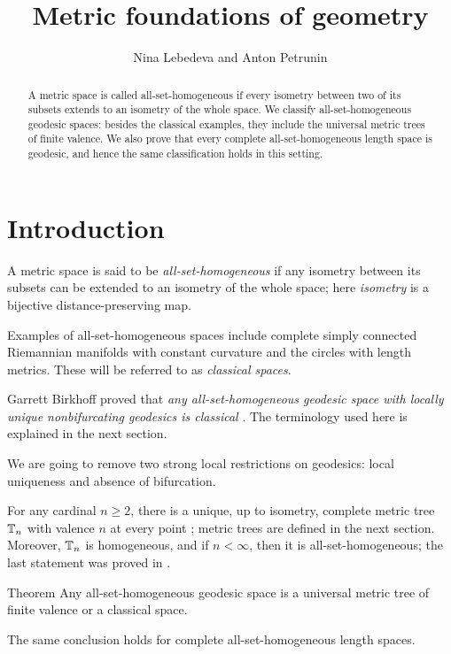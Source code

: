 \documentclass[leqno,a4paper,10pt]{article}
\def\thetitle{Metric foundations of geometry}
\def\theauthors{Nina Lebedeva and Anton Petrunin}
\begin{document}
\title{\thetitle}
\author{\theauthors}
\date{}
\maketitle

\begin{abstract}
A metric space is called all-set-homogeneous if every isometry between two of its subsets
extends to an isometry of the whole space.
We classify all-set-homogeneous geodesic spaces: besides the classical examples, they include the universal metric trees of finite valence.
We also prove that every complete all-set-homogeneous length space is geodesic,
and hence the same classification holds in this setting.
\end{abstract}

\section{Introduction}

A metric space is said to be \emph{all-set-homogeneous}
if any isometry between its subsets can be extended to an isometry of the whole space; here \emph{isometry} is a bijective distance-preserving map.

Examples of all-set-homogeneous spaces include complete simply connected Riemannian manifolds with constant curvature and the circles with length metrics.
These will be referred to as \emph{classical spaces}.

Garrett Birkhoff proved that \emph{any all-set-homogeneous geodesic space with locally unique nonbifurcating geodesics is classical} \cite{birkhoff}.
The terminology used here is explained in the next section.

We are going to remove two strong local restrictions on geodesics: local uniqueness and absence of bifurcation.

For any cardinal $n\ge2$, there is a unique, up to isometry,
complete metric tree $\mathbb{T}_n$ with valence $n$ at every point \cite{dyubina-polterovich};
metric trees are defined in the next section.
Moreover, $\mathbb{T}_n$ is homogeneous, and if $n<\infty$, then it is all-set-homogeneous; the last statement was proved in \cite{lebedeva-petrunin2024}.

\begin{thm}{Theorem}\label{thm:main}
Any all-set-homogeneous geodesic space is a universal metric tree of finite valence or a classical space.

The same conclusion holds for complete all-set-homogeneous length spaces.
\end{thm}
\end{document}
